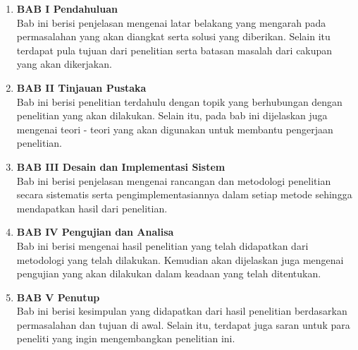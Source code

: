 \begin{enumerate}[nolistsep]

  \item \textbf{BAB I Pendahuluan} \\     
      Bab ini berisi penjelasan mengenai latar belakang yang mengarah pada permasalahan yang akan diangkat serta solusi yang diberikan. Selain itu terdapat pula tujuan dari penelitian serta batasan masalah dari cakupan yang akan dikerjakan.
        \vspace{2ex}

  \item \textbf{BAB II Tinjauan Pustaka} \\
      Bab ini berisi penelitian terdahulu dengan topik yang berhubungan dengan penelitian yang akan dilakukan. Selain itu, pada bab ini dijelaskan juga mengenai teori - teori yang akan digunakan untuk membantu pengerjaan penelitian.

        \vspace{2ex}

  \item \textbf{BAB III Desain dan Implementasi Sistem} \\
      Bab ini berisi penjelasan mengenai rancangan dan metodologi penelitian secara sistematis serta pengimplementasiannya dalam setiap metode sehingga mendapatkan hasil dari penelitian.

        \vspace{2ex}

  \item \textbf{BAB IV Pengujian dan Analisa} \\
      Bab ini berisi mengenai hasil penelitian yang telah didapatkan dari metodologi yang telah dilakukan. Kemudian akan dijelaskan juga mengenai pengujian yang akan dilakukan dalam keadaan yang telah ditentukan.

        \vspace{2ex}

  \item \textbf{BAB V Penutup} \\
      Bab ini berisi kesimpulan yang didapatkan dari hasil penelitian berdasarkan permasalahan dan tujuan di awal. Selain itu, terdapat juga saran untuk para peneliti yang ingin mengembangkan penelitian ini.

\end{enumerate}
